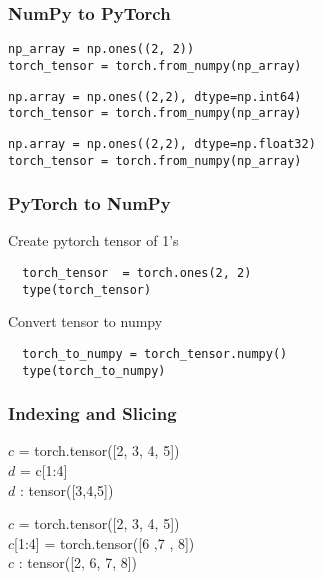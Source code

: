 \documentclass[14 pt]{beamer}
\begin{document}
\begin{frame}[fragile]
  \frametitle{NumPy to PyTorch}
  \begin{block}{}
\begin{verbatim}
np_array = np.ones((2, 2))
torch_tensor = torch.from_numpy(np_array)
\end{verbatim}
  \end{block}

  \begin{block}{}
\begin{verbatim}
np.array = np.ones((2,2), dtype=np.int64)
torch_tensor = torch.from_numpy(np_array)
\end{verbatim}
  \end{block}

  \begin{block}{}
\begin{verbatim}
np.array = np.ones((2,2), dtype=np.float32)
torch_tensor = torch.from_numpy(np_array)
\end{verbatim}
  \end{block}
\end{frame}

\begin{frame}[fragile]
  \frametitle{PyTorch to NumPy }
\begin{block}{Create pytorch tensor of 1's}
\begin{verbatim}
  torch_tensor  = torch.ones(2, 2)
  type(torch_tensor)
\end{verbatim}
\end{block}

\begin{block}{Convert tensor to numpy}
\begin{verbatim}
  torch_to_numpy = torch_tensor.numpy()
  type(torch_to_numpy)
\end{verbatim}
\end{block}
\end{frame}

\begin{frame}
  \frametitle{Indexing and Slicing}
\begin{block}{}
$c$  = torch.tensor([2, 3, 4, 5]) \\
$d$ = c[1:4] \\
$d$ : tensor([3,4,5])
\end{block}
\begin{block}{}
$c$  = torch.tensor([2, 3, 4, 5]) \\
$c$[1:4] = torch.tensor([6 ,7 , 8]) \\
$c$ : tensor([2, 6, 7, 8])
\end{block}
\end{frame}
\end{document}
